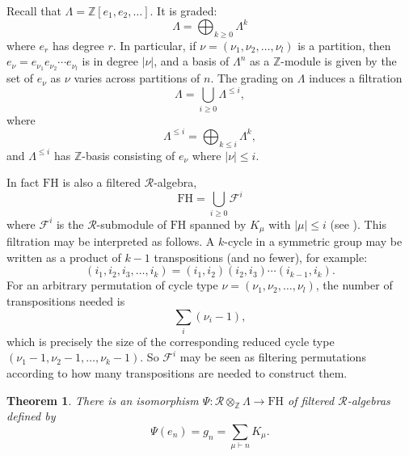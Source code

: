 \documentclass[10pt]{article}
\newtheorem{theorem}{Theorem}[section]
\theoremstyle{definition}
\newcommand{\FH}{\mathrm{FH}}
\begin{document}
Recall that $\Lambda = \mathbb{Z}[e_1, e_2, \ldots]$. It is graded:
\[
\Lambda = \bigoplus_{k \geq 0} \Lambda^k
\]
where $e_r$ has degree $r$. In particular, if $\nu = (\nu_1, \nu_2, \ldots, \nu_l)$ is a partition, then $e_\nu = e_{\nu_1} e_{\nu_2} \cdots e_{\nu_l}$ is in degree $|\nu|$, and a basis of $\Lambda^n$ as a $\mathbb{Z}$-module is given by the set of $e_\nu$ as $\nu$ varies across partitions of $n$. The grading on $\Lambda$ induces a filtration 
\[
\Lambda = \bigcup_{i \geq 0} \Lambda^{\leq i},
\]
where
\[
\Lambda^{\leq i} = \bigoplus_{k \leq i} \Lambda^k,
\]
and $\Lambda^{\leq i}$ has $\mathbb{Z}$-basis consisting of $e_\nu$ where $|\nu| \leq i$.

In fact $\FH$ is also a filtered $\mathcal{R}$-algebra,
\[
\FH = \bigcup_{i \geq 0} \mathcal{F}^i
\]
where $\mathcal{F}^i$ is the $\mathcal{R}$-submodule of $\FH$ spanned by $K_\mu$ with $|\mu| \leq i$ (see  \cite[Lemma 3.9]{FarahatHigman}). This filtration may be interpreted as follows. A $k$-cycle in a symmetric group may be written as a product of $k-1$ transpositions (and no fewer), for example:
\[
(i_1, i_2, i_3, \ldots, i_k) = (i_1, i_2)(i_2, i_3)\cdots(i_{k-1},i_k).
\]
For an arbitrary permutation of cycle type $\nu = (\nu_1, \nu_2, \ldots, \nu_l)$, the number of transpositions needed is
\[
\sum_i (\nu_i - 1),
\]
which is precisely the size of the corresponding reduced cycle type $(\nu_1-1, \nu_2-1, \ldots, \nu_k-1)$. So $\mathcal{F}^i$ may be seen as filtering permutations according to how many transpositions are needed to construct them.

\begin{theorem} \label{thm:FH_lambda_iso}
There is an isomorphism $\Psi: \mathcal{R} \otimes_{\mathbb{Z}} \Lambda \to \FH$ of filtered $\mathcal{R}$-algebras defined by
\[
\Psi(e_n) = g_n = \sum_{\mu \vdash n} K_\mu.
\]
\end{theorem}
\end{document}
